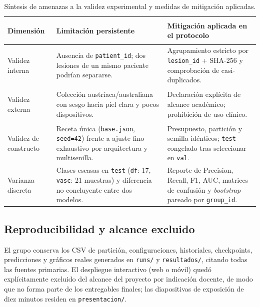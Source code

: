 \begin{table}[htbp]\centering\small
\caption{Síntesis de amenazas a la validez experimental y medidas de mitigación aplicadas.}
\begin{tabularx}{\textwidth}{@{}>{\bfseries\raggedright\arraybackslash}p{3.0cm}>{\raggedright\arraybackslash}p{5.8cm}>{\raggedright\arraybackslash}X@{}}
\toprule
\textbf{Dimensión} & \textbf{Limitación persistente} & \textbf{Mitigación aplicada en el protocolo} \\ \midrule
Validez interna & Ausencia de \texttt{patient\_id}; dos lesiones de un mismo paciente podrían separarse. & Agrupamiento estricto por \texttt{lesion\_id} + SHA-256 y comprobación de casi-duplicados. \\
Validez externa & Colección austríaca/australiana con sesgo hacia piel clara y pocos dispositivos. & Declaración explícita de alcance académico; prohibición de uso clínico. \\
Validez de constructo & Receta única (\texttt{base.json}, \texttt{seed=42}) frente a ajuste fino exhaustivo por arquitectura y multisenilla. & Presupuesto, partición y semilla idénticos; \texttt{test} congelado tras seleccionar en \texttt{val}. \\
Varianza discreta & Clases escasas en \texttt{test} (\texttt{df}: 17, \texttt{vasc}: 21 muestras) y diferencia no concluyente entre dos modelos. & Reporte de Precision, Recall, F1, AUC, matrices de confusión y \textit{bootstrap} pareado por \texttt{group\_id}. \\
\bottomrule
\end{tabularx}
\end{table}

\subsection{Reproducibilidad y alcance excluido}
El grupo conserva los CSV de partición, configuraciones, historiales, checkpoints, predicciones y gráficos reales generados en \texttt{runs/} y \texttt{resultados/}, citando todas las fuentes primarias. El despliegue interactivo (web o móvil) quedó explícitamente excluido del alcance del proyecto por indicación docente, de modo que no forma parte de los entregables finales; las diapositivas de exposición de diez minutos residen en \texttt{presentacion/}.
